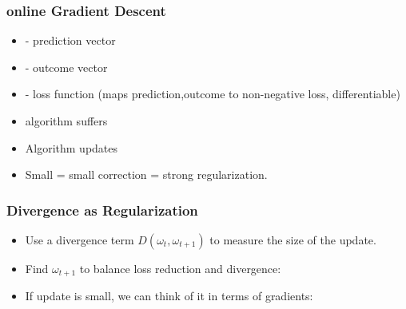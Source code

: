 \documentclass{beamer}
\begin{document}
\begin{frame}
  \frametitle{online Gradient Descent}
  \begin{itemize}
  \item {} - prediction vector
  \item {} - outcome vector
  \item {} - loss function (maps prediction,outcome
    to non-negative loss, differentiable)
  \item algorithm suffers 
  \item Algorithm updates 
  \item Small \R{$\eta$} = small correction = strong regularization.
  \end{itemize}
\end{frame}

\begin{frame}
  \frametitle{Divergence as Regularization}
  \begin{itemize}
  \item Use a divergence term $D(\omega_t,\omega_{t+1})$ to measure
    the size of the update.
  \item Find $\omega_{t+1}$ to balance loss reduction and divergence:
  \item If update is small, we can think of it in terms of gradients:
  \end{itemize}
\end{frame}
\end{document}

